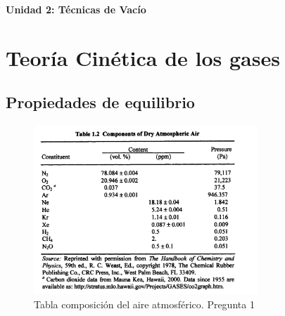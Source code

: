 \begin{titlepage}
   \begin{center}
       \vspace*{9cm}
       \LARGE
       \textbf{Unidad 2: Técnicas de Vacío}

      
   
            
       \vspace{0.8cm}
     
      
   \end{center}
\end{titlepage}
\section{Teoría Cinética de los gases}

\subsection{Propiedades de equilibrio}
 \begin{figure}
        \centering
        \includegraphics[width=0.75\textwidth]{Imagenes/Unidad/U2/Tabla composición del aire atmosférico.jpg}
        \caption{Tabla composición del aire atmosférico. Pregunta 1}
        \label{fig:my_label}
    \end{figure}

